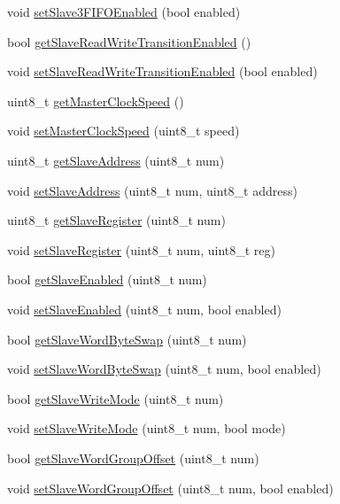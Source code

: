 \begin{DoxyCompactItemize}
void \hyperlink{classMPU6050_a6ed713870c7f6d085ded91a45515a36c}{set\+Slave3\+F\+I\+F\+O\+Enabled} (bool enabled)
\item 
bool \hyperlink{classMPU6050_a6b3c3aab80fcaa384303f9df2a59d7eb}{get\+Slave\+Read\+Write\+Transition\+Enabled} ()
\item 
void \hyperlink{classMPU6050_a3413efbf2f4e8a27aa8768d9bc34d663}{set\+Slave\+Read\+Write\+Transition\+Enabled} (bool enabled)
\item 
uint8\+\_\+t \hyperlink{classMPU6050_a4cda448ef5c5736bd14188947342d636}{get\+Master\+Clock\+Speed} ()
\item 
void \hyperlink{classMPU6050_a8a4779ea709ff0633f9798369478400b}{set\+Master\+Clock\+Speed} (uint8\+\_\+t speed)
\item 
uint8\+\_\+t \hyperlink{classMPU6050_af75b9f7ccac48515c7544238db0e6863}{get\+Slave\+Address} (uint8\+\_\+t num)
\item 
void \hyperlink{classMPU6050_a3c07eb2c59fff3ddc7186319ee40ba6f}{set\+Slave\+Address} (uint8\+\_\+t num, uint8\+\_\+t address)
\item 
uint8\+\_\+t \hyperlink{classMPU6050_ae7e9ead9645bcef326eb579c6ab5d5ff}{get\+Slave\+Register} (uint8\+\_\+t num)
\item 
void \hyperlink{classMPU6050_a62851e982059a2462d52c210ad764a1c}{set\+Slave\+Register} (uint8\+\_\+t num, uint8\+\_\+t reg)
\item 
bool \hyperlink{classMPU6050_a5f14bde83fe00b27dec6776fc44e89c2}{get\+Slave\+Enabled} (uint8\+\_\+t num)
\item 
void \hyperlink{classMPU6050_afaffa021d7bb41f3a288827080602eee}{set\+Slave\+Enabled} (uint8\+\_\+t num, bool enabled)
\item 
bool \hyperlink{classMPU6050_a18e8f3d053a68f0e5ecf497c87ecac8a}{get\+Slave\+Word\+Byte\+Swap} (uint8\+\_\+t num)
\item 
void \hyperlink{classMPU6050_abeb1f83652066d7543fd3283af794364}{set\+Slave\+Word\+Byte\+Swap} (uint8\+\_\+t num, bool enabled)
\item 
bool \hyperlink{classMPU6050_adb99955fa66300b1f0bedfcdd8187412}{get\+Slave\+Write\+Mode} (uint8\+\_\+t num)
\item 
void \hyperlink{classMPU6050_a3d9bfcb5394c7a382009cd2dc91ce801}{set\+Slave\+Write\+Mode} (uint8\+\_\+t num, bool mode)
\item 
bool \hyperlink{classMPU6050_a32ce8023bb80afc5d55811de70c7214f}{get\+Slave\+Word\+Group\+Offset} (uint8\+\_\+t num)
\item 
void \hyperlink{classMPU6050_a32602ab86f70b70d3313628fc6c010ae}{set\+Slave\+Word\+Group\+Offset} (uint8\+\_\+t num, bool enabled)

\end{DoxyCompactItemize}
